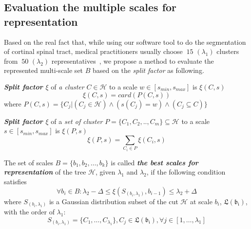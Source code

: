 \subsection{Evaluation the multiple scales for representation}
\label{subsec:evaluation_scales}
Based on the real fact that, while using our software tool to do the segmentation of cortinal spinal tract, medical practitioners usually choose $~15$ $(\lambda_1)$ clusters from $~50$ $(\lambda_2)$ representatives~\cite{olivetti2013fast}, we propose a method to evaluate the represented multi-scale set $\mathsf{\textit{B}}$ based on the \textit{split factor} as following.

\begin{definition}
\label{def:split_factor} \textbf{\textit{Split factor $\xi$}} of \textit{a cluster} $C \in \mathcal{H}$ to a scale $w \in [s_{min},s_{max}]$ is $\xi(C,s)$
\begin{equation}
\xi(C,s) = card(P(C,s))
\end{equation}
where $P(C,s) = \{ C_j | (C_j \in \mathcal{H}) \wedge (s(C_j) = w) \wedge (C_j \subseteq C) \}$ 
\end{definition}
\begin{definition}
\label{def:split_factor_set} \textbf{\textit{Split factor $\xi$}} of a \textit{set of cluster} $P=\{C_1, C_2,.., C_m\} \subseteq \mathcal{H}$ to a scale $s \in [s_{min},s_{max}]$ is $\xi(P,s)$
\begin{equation}
\xi(P,s) = \sum_{C_i \in P}\xi(C_i,s)
\end{equation}
\end{definition}
\begin{definition}
\label{def:best_scales} The set of scales $\mathsf{\textit{B}} = \{b_1, b_2, \ldots, b_k\}$ is called \textbf{\textit{the best scales for representation}} of the tree $\mathcal{H}$, given $\lambda_1$ and $\lambda_2$, if the following condition satisfies
\begin{equation}
\label{equ:best_scale}
\forall b_i \in \mathsf{\textit{B}}: \lambda_2 - \Delta \leq \xi(S_{(b_i,\lambda_1)},b_{i-1}) \leq \lambda_2 + \Delta 
\end{equation}
where $S_{(b_i,\lambda_1)}$ is a Gaussian distribution subset of the cut $\mathcal{H}$ at scale $b_i$, $\mathfrak{L(b_i)}$, with the order of $\lambda_1$:
\begin{equation}
S_{(b_i,\lambda_1)} = \{C_1, \ldots, C_{\lambda_1}\}, C_j \in \mathfrak{L(b_i)}, \forall j \in [1, \ldots, \lambda_1] 
\end{equation}
\end{definition}
